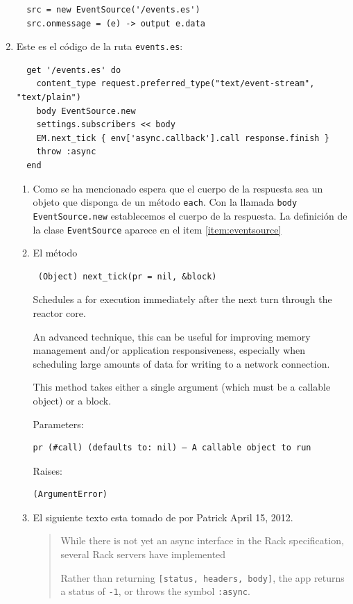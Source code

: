 \begin{enumerate}
\begin{verbatim}
  src = new EventSource('/events.es')
  src.onmessage = (e) -> output e.data
\end{verbatim}
\item Este es el código de la ruta \verb|events.es|:
\begin{verbatim}
  get '/events.es' do
    content_type request.preferred_type("text/event-stream", "text/plain")
    body EventSource.new
    settings.subscribers << body
    EM.next_tick { env['async.callback'].call response.finish }
    throw :async
  end
\end{verbatim}
\begin{enumerate}
\item 
Como se ha mencionado \rack{} espera que el cuerpo de la respuesta sea un objeto
que disponga de un método \verb|each|. Con la llamada \verb|body EventSource.new|
establecemos el cuerpo de la respuesta. La definición de la clase \verb|EventSource| 
aparece en el item \ref{item:eventsource}
\item El método 
\begin{verbatim}
 (Object) next_tick(pr = nil, &block)
\end{verbatim}
Schedules a \Proc{} for execution immediately after the next turn
through the reactor core. 

An advanced technique, this can be useful
for improving memory management and/or application responsiveness,
especially when scheduling large amounts of data for writing to a
network connection.

This method takes either a single argument (which must be a callable object) or a block.

Parameters:
\begin{verbatim}
pr (#call) (defaults to: nil) — A callable object to run
\end{verbatim}
Raises:
\begin{verbatim}
(ArgumentError)
\end{verbatim}
\item 
El siguiente texto esta tomado de
por Patrick April 15, 2012.

\begin{quote}
While there is not yet an async interface in the Rack specification,
several Rack servers have implemented 


Rather than returning \verb|[status, headers, body]|, the app returns a
status of \verb|-1|, or throws the symbol \verb|:async|. 


\end{quote}
\end{enumerate}
\end{enumerate}
